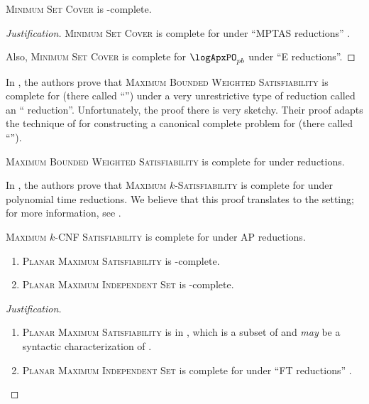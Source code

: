 \documentclass[]{article}
\newenvironment{justification}{\begin{proof}[Justification]}{\end{proof}}
\begin{document}
\begin{conjecture}
  \textsc{Minimum Set Cover} is \logApxNCO-complete.
\end{conjecture}
\begin{justification}
  \textsc{Minimum Set Cover} is complete for \logApxPO{} under ``MPTAS reductions'' \cite[Example~2.48]{cks01} \cite[Theorem~5]{ep06} \cite[Theorem~27]{ep10}.

  Also, \textsc{Minimum Set Cover} is complete for $\logApxPO_{pb}$ under ``E reductions''.
\end{justification}

In \cite{sx95}, the authors prove that \textsc{Maximum Bounded Weighted Satisfiability} is complete for \ApxNCO{} (there called ``\NCX'') under a very unrestrictive type of reduction called an ``\NCAS{} reduction''.
Unfortunately, the proof there is very sketchy.
Their proof adapts the technique of \cite{cp91} for constructing a canonical complete problem for \ApxPO{} (there called ``\APX'').

\begin{theorem}
  \textsc{Maximum Bounded Weighted Satisfiability} is complete for \ApxNCO{} under \NCAS{} reductions.
\end{theorem}

In \cite[Theorem~8.6]{acgkmp99}, the authors prove that \textsc{Maximum $k$-Satisfiability} is complete for \ApxPO{} under polynomial time \AP{} reductions.
We believe that this proof translates to the \NC{} setting; for more information, see \cite{finkelstein13b}.

\begin{theorem}{\cite{finkelstein13b}}
  \textsc{Maximum $k$-CNF Satisfiability} is complete for \ApxNCO{} under \NC{} AP reductions.
\end{theorem}

\begin{conjecture}
  \mbox{}
  \begin{enumerate}
  \item \textsc{Planar Maximum Satisfiability} is \NCAS-complete.
  \item \textsc{Planar Maximum Independent Set} is \NCAS-complete.
  \end{enumerate}
\end{conjecture}
\begin{justification}
  \mbox{}
  \begin{enumerate}
  \item \textsc{Planar Maximum Satisfiability} is in \PMPSAT, which is a subset of \PTAS{} and \emph{may} be a syntactic characterization of \PTAS{} \cite{km96}.
  \item \textsc{Planar Maximum Independent Set} is complete for \PTAS{} under ``FT reductions'' \cite[Theorem~6]{bep06}. \qedhere
  \end{enumerate}
\end{justification}
\end{document}
